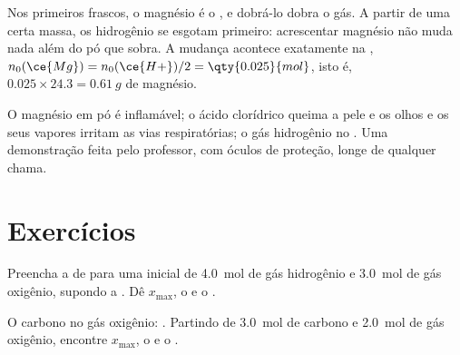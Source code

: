 \begin{remark}\label{rem:g10:reaction-progress-table:plateau}
Nos primeiros frascos, o magnésio é o , e dobrá-lo
dobra o gás. A partir de uma certa massa, os  hidrogênio se esgotam
primeiro: acrescentar magnésio não muda nada além do pó que sobra. A
mudança acontece exatamente na ,
$n_0(\ce{Mg}) = n_0(\ce{H+})/2 = \qty{0.025}{mol}$, isto é,
$0.025 \times 24.3 = \qty{0.61}{g}$ de magnésio.
\end{remark}

\begin{safety}{}
O magnésio em pó é inflamável; o ácido clorídrico queima a pele e os
olhos e os seus vapores irritam as vias respiratórias; o gás hidrogênio
 no . Uma demonstração feita pelo professor, com óculos de
proteção, longe de qualquer chama.
\end{safety}

\section{Exercícios}

\begin{exercise}[$\star$]\label{exo:g10:reaction-progress-table:1}
Preencha a  de  para uma 
inicial de \qty{4.0}{mol} de gás hidrogênio e \qty{3.0}{mol} de gás
oxigênio, supondo a . Dê $x_{\max}$, o  e
o .
\end{exercise}

\begin{exercise}[$\star$]\label{exo:g10:reaction-progress-table:2}
O carbono  no gás oxigênio: . Partindo de
\qty{3.0}{mol} de carbono e \qty{2.0}{mol} de gás oxigênio, encontre
$x_{\max}$, o  e o .
\end{exercise}

